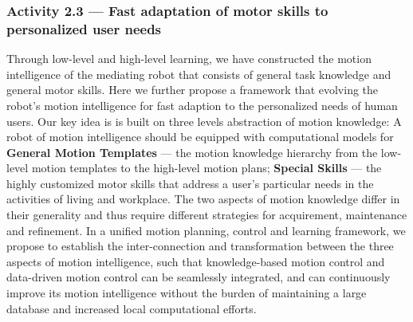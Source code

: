 \documentclass[letterpaper, 11 pt, onecolumn]{article}
\begin{document}


\subsubsection{Activity 2.3 --- Fast adaptation of motor skills to personalized user needs}\label{sec:plan-motion-high}
Through low-level and high-level learning, we have constructed the motion intelligence of the mediating robot that consists of general task knowledge and general motor skills. Here we further propose a framework that evolving the robot's motion intelligence for fast adaption to the personalized needs of human users. Our key idea is is built on three levels abstraction of motion knowledge: A robot of motion intelligence should be equipped with computational models for \textbf{General Motion Templates} --- the motion knowledge hierarchy from the low-level motion templates to the high-level motion plans; \textbf{Special Skills} --- the highly customized motor skills that address a user's particular needs in the activities of living and workplace. The two aspects of motion knowledge differ in their generality and thus require different strategies for acquirement, maintenance and refinement. In a unified motion planning, control and learning framework, we propose to establish the inter-connection and transformation between the three aspects of motion intelligence, such that knowledge-based motion control and data-driven motion control can be seamlessly integrated, and can continuously improve its motion intelligence without the burden of maintaining a large database and increased local computational efforts. 
\end{document}
